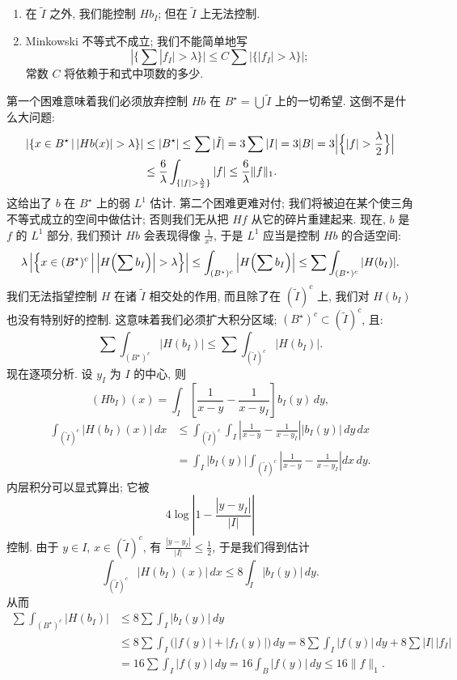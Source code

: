 \begin{enumerate}[label=\arabic*)]
\item 在 $\tilde{I}$ 之外, 我们能控制 $Hb_{I}$; 但在 $\tilde{I}$ 上无法控制.
\item Minkowski 不等式不成立; 我们不能简单地写
\[
|\{\textstyle\sum|f_{I}|>\lambda\}|\leq C\sum|\{|f_{I}|>\lambda\}|;
\]
常数 $C$ 将依赖于和式中项数的多少.
\end{enumerate}

第一个困难意味着我们必须放弃控制 $Hb$ 在 $B^{\star}=\bigcup\tilde{I}$ 上的一切希望. 这倒不是什么大问题:
\begin{align*}
\left|\left\{x\in B^{\star}\,\middle|\,|H b(x)|>\lambda\right\}\right|
&\leq|B^{\star}|\leq\sum|\tilde{I}|=3\sum|I|=3|B|=3\Bigl|\Bigl\{|f|>\frac{\lambda}{2}\Bigr\}\Bigr| \\
&\leq\frac{6}{\lambda}\int_{\{|f|>\frac{\lambda}{2}\}}|f|
\leq\frac{6}{\lambda}\|f\|_{1}.
\end{align*}
这给出了 $b$ 在 $B^{\star}$ 上的弱 $L^1$ 估计. 第二个困难更难对付; 我们将被迫在某个使三角不等式成立的空间中做估计; 否则我们无从把 $Hf$ 从它的碎片重建起来. 现在, $b$ 是 $f$ 的 $L^1$ 部分, 我们预计 $Hb$ 会表现得像 $\frac{1}{x^{2}}$, 于是 $L^1$ 应当是控制 $Hb$ 的合适空间:
\[
\lambda\left|\left\{x\in(B^{\star})^{c}\,\middle|\,\left|H\Bigl(\sum b_{I}\Bigr)\right|>\lambda\right\}\right|
\leq\int_{(B^{\star})^{c}}\left|H\Bigl(\sum b_{I}\Bigr)\right|
\leq\sum\int_{(B^{\star})^{c}}|H(b_{I})|.
\]
我们无法指望控制 $H$ 在诸 $\tilde{I}$ 相交处的作用, 而且除了在 $(\tilde{I})^{c}$ 上, 我们对 $H(b_I)$ 也没有特别好的控制. 这意味着我们必须扩大积分区域; $(B^{\star})^{c}\subset(\tilde{I})^{c}$, 且:
\[
\sum\int_{(B^{\star})^{c}}|H(b_{I})|\leq\sum\int_{(\tilde{I})^{c}}|H(b_{I})|.
\]
现在逐项分析. 设 $y_{I}$ 为 $I$ 的中心, 则
\[
\left(H b_{I}\right)(x)=\int_{I}\left[\frac{1}{x-y}-\frac{1}{x-y_{I}}\right]b_{I}(y)\,dy,
\]
\begin{align*}
\int_{(\tilde{I})^{c}}|H(b_{I})(x)|\,dx
&\leq\int_{(\tilde{I})^{c}}\int_{I}\left|\frac{1}{x-y}-\frac{1}{x-y_{I}}\right||b_{I}(y)|\,dy\,dx \\
&=\int_{I}|b_{I}(y)|\int_{(\tilde{I})^{c}}\left|\frac{1}{x-y}-\frac{1}{x-y_{I}}\right|dx\,dy.
\end{align*}
内层积分可以显式算出; 它被
\[
4\log\left|1-\frac{|y-y_{I}|}{|I|}\right|
\]
控制. 由于 $y\in I$, $x\in(\tilde{I})^{c}$, 有 $\frac{|y-y_{I}|}{|I|}\leq\frac{1}{2}$, 于是我们得到估计
\[
\int_{(\tilde{I})^{c}}|H(b_{I})(x)|\,dx\leq 8\int_{I}|b_{I}(y)|\,dy.
\]
从而
\begin{align*}
\sum\int_{(B^{\star})^{c}}|H(b_{I})|
&\leq 8\sum\int_{I}|b_{I}(y)|\,dy \\
&\leq 8\sum\int_{I}\bigl(|f(y)|+|f_{I}(y)|\bigr)\,dy
=8\sum\int_{I}|f(y)|\,dy+8\sum|I|\,|f_{I}| \\
&=16\sum\int_{I}|f(y)|\,dy
=16\int_{B}|f(y)|\,dy\leq 16\|f\|_{1}.
\end{align*}
